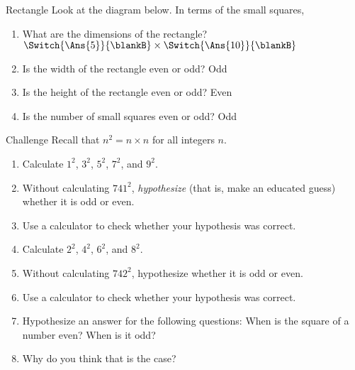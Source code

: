 \documentclass[12pt,letterpaper]{article}
\begin{document}
\begin{problem}{Rectangle}
 Look at the diagram below. In terms of the small squares,

 \begin{center}
 \end{center}

 \begin{enumerate}
  \item What are the dimensions of the rectangle? \hfill
  \(\Switch{\Ans{5}}{\blankB}\times\Switch{\Ans{10}}{\blankB}\)
  \item Is the width of the rectangle even or odd?
  \hfill Odd \hspace{1em} 
  \item Is the height of the rectangle even or odd?
  \hfill {} \hspace{1em} Even
  \item Is the number of small squares even or odd?
  \hfill Odd \hspace{1em} 
 \end{enumerate}
\end{problem}

\begin{problem}{Challenge}
  Recall that \(n^2 = n\times n\) for all integers \(n\).

 \begin{enumerate}
  \item Calculate $1^2$, $3^2$, $5^2$, $7^2$, and $9^2$.
  \item Without calculating $741^2$, \emph{hypothesize} (that is, make an
  educated guess) whether it is odd or even.
  \item Use a calculator to check whether your hypothesis was correct.
  \item Calculate \(2^2\), $4^2$, $6^2$, and $8^2$.
  \item Without calculating $742^2$, hypothesize whether it is odd or even.
  \item Use a calculator to check whether your hypothesis was correct.
  \item Hypothesize an answer for the following questions:
  When is the square of a number even? When is it odd?
  \item Why do you think that is the case?
 \end{enumerate}
\end{problem}
\end{document}
